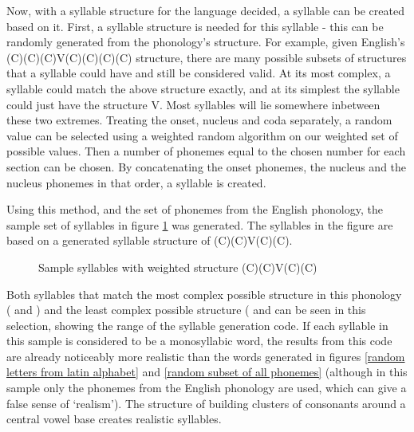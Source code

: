 \documentclass{report}
\begin{document}
	Now, with a syllable structure for the language decided, a syllable can be created based on it. First, a syllable structure is needed for this syllable - this can be randomly generated from the phonology's structure. For example, given English's (C)(C)(C)V(C)(C)(C)(C) structure, there are many possible subsets of structures that a syllable could have and still be considered valid. At its most complex, a syllable could match the above structure exactly, and at its simplest the syllable could just have the structure V. Most syllables will lie somewhere inbetween these two extremes. Treating the onset, nucleus and coda separately, a random value can be selected using a weighted random algorithm on our weighted set of possible values. Then a number of phonemes equal to the chosen number for each section can be chosen. By concatenating the onset phonemes, the nucleus and the nucleus phonemes in that order, a syllable is created.
	
	Using this method, and the set of phonemes from the English phonology, the sample set of syllables in figure \ref{sample syllables with weighted structure} was generated. The syllables in the figure are based on a generated syllable structure of (C)(C)V(C)(C).
	
	\begin{figure}
		\caption{Sample syllables with weighted structure (C)(C)V(C)(C)}
		\label{sample syllables with weighted structure}  
		\begin{tcolorbox}
		\end{tcolorbox}
	\end{figure}

	Both syllables that match the most complex possible structure in this phonology ( and ) and the least complex possible structure ( and  can be seen in this selection, showing the range of the syllable generation code. If each syllable in this sample is considered to be a monosyllabic word, the results from this code are already noticeably more realistic than the words generated in figures \ref{random letters from latin alphabet} and \ref{random subset of all phonemes} (although in this sample only the phonemes from the English phonology are used, which can give a false sense of `realism'). The structure of building clusters of consonants around a central vowel base creates realistic syllables.
	
\end{document}
